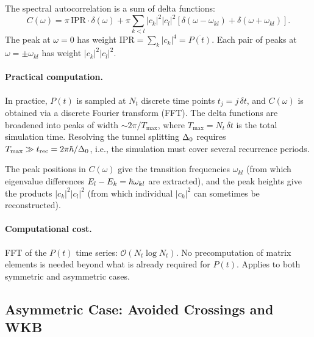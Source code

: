 \begin{result}\label{res:spectral}
The spectral autocorrelation is a sum of delta functions:
\begin{equation}\label{eq:C_omega_final}
  \boxed{C(\omega) = \pi\,\text{IPR}\cdot\delta(\omega) + \pi\sum_{k<l}|c_k|^2|c_l|^2\left[\delta(\omega - \omega_{kl}) + \delta(\omega + \omega_{kl})\right].}
\end{equation}
The peak at $\omega = 0$ has weight $\text{IPR} = \sum_k|c_k|^4 = \overline{P(t)}$.
Each pair of peaks at $\omega = \pm\omega_{kl}$ has weight $|c_k|^2|c_l|^2$.
\end{result}

\paragraph{Practical computation.}

In practice, $P(t)$ is sampled at $N_t$ discrete time points $t_j = j\,\delta t$, and $C(\omega)$ is obtained via a discrete Fourier transform (FFT).
The delta functions are broadened into peaks of width $\sim 2\pi/T_{\max}$, where $T_{\max} = N_t\,\delta t$ is the total simulation time.
Resolving the tunnel splitting $\Delta_0$ requires $T_{\max} \gg t_{\text{rec}} = 2\pi\hbar/\Delta_0$, i.e., the simulation must cover several recurrence periods.

The peak positions in $C(\omega)$ give the transition frequencies $\omega_{kl}$ (from which eigenvalue differences $E_l - E_k = \hbar\omega_{kl}$ are extracted), and the peak heights give the products $|c_k|^2|c_l|^2$ (from which individual $|c_k|^2$ can sometimes be reconstructed).

\paragraph{Computational cost.}
FFT of the $P(t)$ time series: $\mathcal{O}(N_t \log N_t)$.
No precomputation of matrix elements is needed beyond what is already required for $P(t)$.
Applies to both symmetric and asymmetric cases.

\subsection{Asymmetric Case: Avoided Crossings and WKB}\label{sec:asym_advanced}

